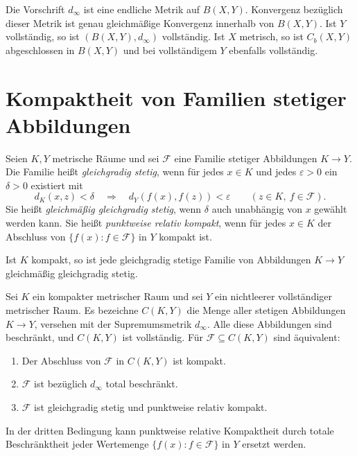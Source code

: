 \begin{theorem}
\label{b47guide:thm:function-space-completeness}
Die Vorschrift $d_\infty$ ist eine endliche Metrik auf $B(X,Y)$.
Konvergenz bezüglich dieser Metrik ist genau gleichmäßige Konvergenz
innerhalb von $B(X,Y)$.
Ist $Y$ vollständig, so ist $(B(X,Y),d_\infty)$ vollständig.
Ist $X$ metrisch, so ist $C_b(X,Y)$ abgeschlossen in $B(X,Y)$
und bei vollständigem $Y$ ebenfalls vollständig.
\cite{metric-notes}
\end{theorem}

\section{Kompaktheit von Familien stetiger Abbildungen}

\begin{definition}
\label{b47guide:def:equicontinuity}
Seien $K,Y$ metrische Räume und sei $\mathcal F$ eine Familie
stetiger Abbildungen $K\to Y$.
Die Familie heißt \emph{gleichgradig stetig}, wenn für jedes $x\in K$
und jedes $\varepsilon>0$ ein $\delta>0$ existiert mit
\[
 d_K(x,z)<\delta\quad\Longrightarrow\quad
 d_Y(f(x),f(z))<\varepsilon
 \qquad(z\in K,\ f\in\mathcal F).
\]
Sie heißt \emph{gleichmäßig gleichgradig stetig}, wenn $\delta$
auch unabhängig von $x$ gewählt werden kann.
Sie heißt \emph{punktweise relativ kompakt}, wenn für jedes $x\in K$
der Abschluss von $\{f(x):f\in\mathcal F\}$ in $Y$ kompakt ist.
\end{definition}

\begin{theorem}
\label{b47guide:thm:uniform-equicontinuity}
Ist $K$ kompakt, so ist jede gleichgradig stetige Familie von
Abbildungen $K\to Y$ gleichmäßig gleichgradig stetig.
\end{theorem}

\begin{theorem}
\label{b47guide:thm:ascoli}
Sei $K$ ein kompakter metrischer Raum und sei $Y$ ein nichtleerer
vollständiger metrischer Raum. Es bezeichne $C(K,Y)$ die Menge
aller stetigen Abbildungen $K\to Y$, versehen mit der
Supremumsmetrik $d_\infty$. Alle diese Abbildungen sind beschränkt,
und $C(K,Y)$ ist vollständig.
Für $\mathcal F\subseteq C(K,Y)$ sind äquivalent:
\begin{enumerate}
\item Der Abschluss von $\mathcal F$ in $C(K,Y)$ ist kompakt.
\item $\mathcal F$ ist bezüglich $d_\infty$ total beschränkt.
\item $\mathcal F$ ist gleichgradig stetig und punktweise relativ kompakt.
\end{enumerate}
In der dritten Bedingung kann punktweise relative Kompaktheit
durch totale Beschränktheit jeder Wertemenge
$\{f(x):f\in\mathcal F\}$ in $Y$ ersetzt werden.
\cite{ascoli-notes}
\end{theorem}

